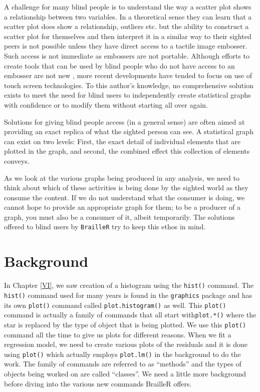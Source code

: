 \documentclass[
]{book}
\begin{document}
A challenge for many blind people is to understand the way a scatter plot shows a relationship between two variables. In a theoretical sense they can learn that a scatter plot does show a relationship, outliers etc. but the ability to construct a scatter plot for themselves and then interpret it in a similar way to their sighted peers is not possible unless they have direct access to a tactile image embosser. Such access is not immediate as embossers are not portable. Although efforts to create tools that can be used by blind people who do not have access to an embosser are not new \citep{CalderEtAl2006}, more recent developments have tended to focus on use of touch screen technologies. To this author's knowledge, no comprehensive solution exists to meet the need for blind users to independently create statistical graphs with confidence or to modify them without starting all over again.

Solutions for giving blind people access (in a general sense) are often aimed at providing an exact replica of what the sighted person can see. A statistical graph can exist on two levels: First, the exact detail of individual elements that are plotted in the graph, and second, the combined effect this collection of elements conveys.

As we look at the various graphs being produced in any analysis, we need to think about which of these activities is being done by the sighted world as they consume the content. If we do not understand what the consumer is doing, we cannot hope to provide an appropriate graph for them; to be a producer of a graph, you must also be a consumer of it, albeit temporarily. The solutions offered to blind users by \texttt{BrailleR} try to keep this ethos in mind.

\hypertarget{background}{%
\section{Background}\label{background}}

In Chapter \ref{VI}, we saw creation of a histogram using the \texttt{hist()} command. The \texttt{hist()} command used for many years is found in the \texttt{graphics} package and has its own \texttt{plot()} command called \texttt{plot.histogram()} as well. This \texttt{plot()} command is actually a family of commands that all start with\texttt{plot.*()} where the star is replaced by the type of object that is being plotted. We use this \texttt{plot()} command all the time to give us plots for different reasons. When we fit a regression model, we need to create various plots of the residuals and it is done using \texttt{plot()} which actually employs \texttt{plot.lm()} in the background to do the work. The family of commands are referred to as ``methods'' and the types of objects being worked on are called ``classes''. We need a little more background before diving into the various new commands BrailleR offers.
\end{document}
